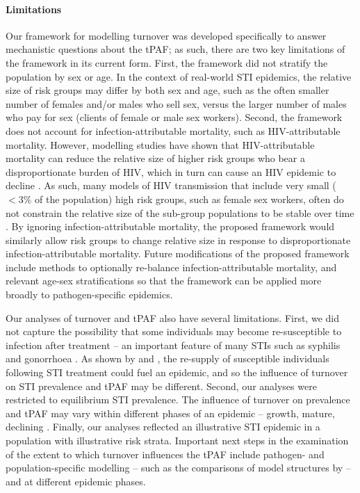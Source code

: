 \paragraph{Limitations}
Our framework for modelling turnover was developed
specifically to answer mechanistic questions about the tPAF;
as such, there are two key limitations of the framework in its current form.
First, the framework did not stratify the population by sex or age.
In the context of real-world STI epidemics,
the relative size of risk groups may differ by both sex and age,
such as the often smaller number of females and/or males who sell sex,
versus the larger number of males who pay for sex (clients of female or male sex workers).
Second, the framework does not account for
infection-attributable mortality, such as HIV-attributable mortality.
However, modelling studies have shown that HIV-attributable mortality can reduce the
relative size of higher risk groups who bear a disproportionate burden of HIV,
which in turn can cause an HIV epidemic to decline \citep{Boily1997}.
As such, many models of HIV transmission that include
very small ($<3\%$ of the population) high risk groups, such as female sex workers,
often do not constrain the relative size
of the sub-group populations to be stable over time \citep{Pickles2013}.
By ignoring infection-attributable mortality,
the proposed framework would similarly allow risk groups to change relative size
in response to disproportionate infection-attributable mortality.						%
Future modifications of the proposed framework include methods to optionally re-balance
infection-attributable mortality, and relevant age-sex stratifications so that
the framework can be applied more broadly to pathogen-specific epidemics.
\par
Our analyses of turnover and tPAF also have several limitations.
First, we did not capture the possibility that some individuals may become
re-susceptible to infection after treatment
-- an important feature of many STIs such as syphilis and gonorrhoea \citep{Fenton2008}.
As shown by \citet{Fenton2008} and \citet{Pourbohloul2003},
the re-supply of susceptible individuals following STI treatment
could fuel an epidemic, and so the influence of turnover on
STI prevalence and tPAF may be different.
Second, our analyses were restricted to equilibrium STI prevalence.
The influence of turnover on prevalence and tPAF
may vary within different phases of an epidemic
-- growth, mature, declining \citep{Wasserheit1996}.
Finally, our analyses reflected an illustrative STI epidemic
in a population with illustrative risk strata.
Important next steps in the examination of
the extent to which turnover influences the tPAF include
pathogen- and population-specific modelling
-- such as the comparisons of model structures by \citet{Hontelez2013,Johnson2016} --
and at different epidemic phases.
